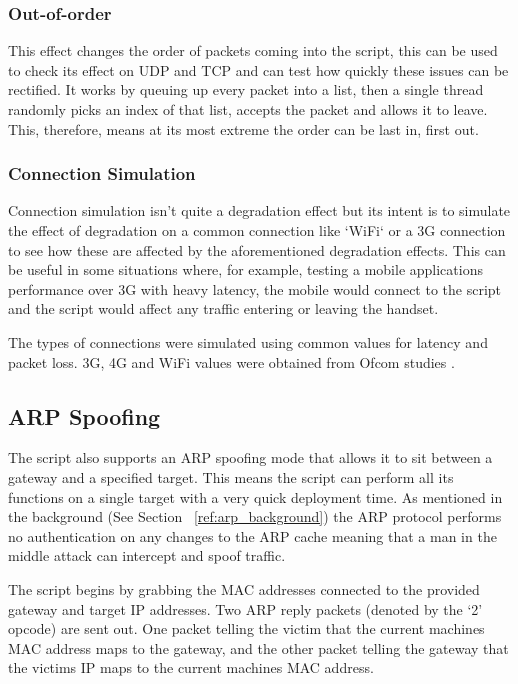 \subsubsection{Out-of-order}
This effect changes the order of packets coming into the script, this can be used to check its effect on UDP and TCP and can test how quickly these issues can be rectified. It works by queuing up every packet into a list, then a single thread randomly picks an index of that list, accepts the packet and allows it to leave. This, therefore, means at its most extreme the order can be last in, first out.

\subsubsection{Connection Simulation}
Connection simulation isn't quite a degradation effect but its intent is to simulate the effect of degradation on a common connection like `WiFi` or a 3G connection to see how these are affected by the aforementioned degradation effects. This can be useful in some situations where, for example, testing a mobile applications performance over 3G with heavy latency, the mobile would connect to the script and the script would affect any traffic entering or leaving the handset.

The types of connections were simulated using common values for latency and packet loss. 3G, 4G and WiFi values were obtained from Ofcom studies \citep{ofcom} \citep{ofcomMobile}.

\subsection{ARP Spoofing}
\label{ref:arpSpoof}
The script also supports an ARP spoofing mode that allows it to sit between a gateway and a specified target. This means the script can perform all its functions on a single target with a very quick deployment time. As mentioned in the background (See Section ~\ref{ref:arp_background}) the ARP protocol performs no authentication on any changes to the ARP cache meaning that a man in the middle attack can intercept and spoof traffic.

The script begins by grabbing the MAC addresses connected to the provided gateway and target IP addresses. Two ARP reply packets (denoted by the `2' opcode) are sent out. One packet telling the victim that the current machines MAC address maps to the gateway, and the other packet telling the gateway that the victims IP maps to the current machines MAC address.

